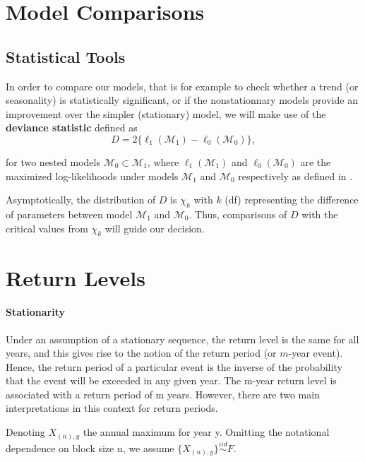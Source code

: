 \documentclass[11pt,a4paper,openany ]{book}
\begin{document}
\section{Model Comparisons}

\subsection{Statistical Tools}

In order to compare our models, that is for example to check whether a trend (or seasonality) is statistically significant, or if the nonstationnary models provide an improvement over the simpler (stationary) model, we will make use of the \textbf{deviance statistic} defined as 
\begin{equation}
D = 2\big\{\ell_1(\mathcal{M}_1)-\ell_0(\mathcal{M}_0)\big\},
\end{equation}

for two nested models $\mathcal{M}_0\subset \mathcal{M}_1$, where $\ell_1(\mathcal{M}_1)$ and $\ell_0(\mathcal{M}_0)$ are the maximized log-likelihoods under models $\mathcal{M}_1$ and $\mathcal{M}_0$ respectively as defined in .

Asymptotically, the distribution of $D$ is $\chi_k$ with $k$ (df) representing the difference of parameters between model $\mathcal{M}_1$ and $\mathcal{M}_0$. Thus, comparisons of $D$ with the critical values from $\chi_k$ will guide our decision.


\section{Return Levels}\label{sec:returnlevnonstatio}


\paragraph*{ Stationarity} Under an assumption of a
stationary sequence, the return level is the same for all years, and this gives rise to the notion
of the return period (or $m$-year event). Hence, the return period of a particular event is the
inverse of the probability that the event will be exceeded in any given year. The m-year return level is associated with a return period of m years. However, there are two main interpretations in this context for return periods.

\cite[pp.100]{aghakouchak_extremes_2013-1}

Denoting $X_{(n),y}$ the annual maximum for year y. Omitting the notational dependence on block size n, we assume $\{X_{(n),y}\}\stackrel{iid}{\sim}F$. 
\end{document}
